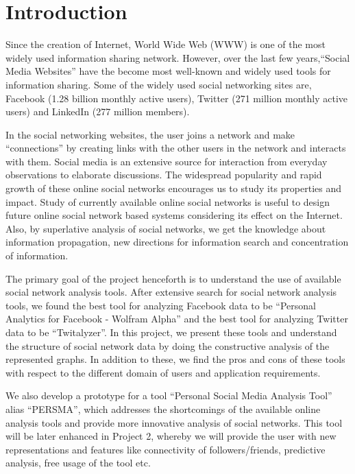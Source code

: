 \documentclass[12pt]{ucthesis}
\begin{document}
\makeatletter
\patchcmd{\chapter}{\if@openright\cleardoublepage\else\clearpage\fi}{}{}{}
\makeatother


\chapter{Introduction}
\label{intro}
Since the creation of Internet, World Wide Web (WWW) is one of the most widely used information sharing network. However, over the last few years,``Social Media Websites'' have the become most well-known and widely used tools for information sharing. Some of the widely used social networking sites are, Facebook (1.28 billion monthly active users), Twitter (271 million monthly active users) and LinkedIn (277 million members).
  
 In the social networking websites, the user joins a network and make ``connections'' by creating links with the other users in the network and interacts with them. Social media is an extensive source for interaction from everyday observations to elaborate discussions. The widespread popularity and rapid growth of these online social networks encourages us to study its properties and impact. Study of currently available online social networks is useful to design future online social network based systems considering its effect on the Internet. Also, by superlative analysis of social networks, we get the knowledge about information propagation, new directions for information search and concentration of information.

  
 The primary goal of the project henceforth is to understand the use of available social network analysis tools. After extensive search for social network analysis tools, we found the best tool for analyzing Facebook data to be ``Personal Analytics for Facebook - Wolfram Alpha'' and the best tool for analyzing Twitter data to be ``Twitalyzer''. In this project, we present these tools and understand the structure of social network data by doing the constructive analysis of the represented graphs. In addition to these, we find the pros and cons of these tools with respect to the different domain of users and application requirements.
 
 We also develop a prototype for a tool ``Personal Social Media Analysis Tool'' alias ``PERSMA'', which addresses the shortcomings of the available online analysis tools and provide more  innovative analysis of social networks. This tool will be later enhanced in Project 2, whereby we will provide the user with new representations and features like  connectivity of followers/friends, predictive analysis, free usage of the tool etc.
 
\end{document}
